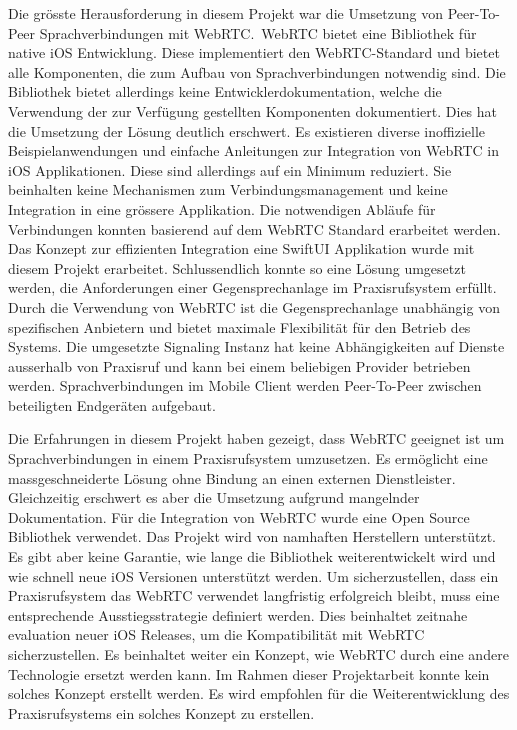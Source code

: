 Die grösste Herausforderung in diesem Projekt war die Umsetzung von Peer-To-Peer Sprachverbindungen mit WebRTC.\
WebRTC bietet eine Bibliothek für native iOS Entwicklung.
Diese implementiert den WebRTC-Standard und bietet alle Komponenten, die zum Aufbau von Sprachverbindungen notwendig sind.
Die Bibliothek bietet allerdings keine Entwicklerdokumentation, welche die Verwendung der zur Verfügung gestellten Komponenten dokumentiert.
Dies hat die Umsetzung der Lösung deutlich erschwert.
Es existieren diverse inoffizielle Beispielanwendungen und einfache Anleitungen zur Integration von WebRTC in iOS Applikationen.
Diese sind allerdings auf ein Minimum reduziert.
Sie beinhalten keine Mechanismen zum Verbindungsmanagement und keine Integration in eine grössere Applikation.
Die notwendigen Abläufe für Verbindungen konnten basierend auf dem WebRTC Standard erarbeitet werden.
Das Konzept zur effizienten Integration eine SwiftUI Applikation wurde mit diesem Projekt erarbeitet.
Schlussendlich konnte so eine Lösung umgesetzt werden, die Anforderungen einer Gegensprechanlage im Praxisrufsystem erfüllt.
Durch die Verwendung von WebRTC ist die Gegensprechanlage unabhängig von spezifischen Anbietern und bietet maximale Flexibilität für den Betrieb des Systems.
Die umgesetzte Signaling Instanz hat keine Abhängigkeiten auf Dienste ausserhalb von Praxisruf und kann bei einem beliebigen Provider betrieben werden.
Sprachverbindungen im Mobile Client werden Peer-To-Peer zwischen beteiligten Endgeräten aufgebaut.

Die Erfahrungen in diesem Projekt haben gezeigt, dass WebRTC geeignet ist um Sprachverbindungen in einem Praxisrufsystem umzusetzen.
Es ermöglicht eine massgeschneiderte Lösung ohne Bindung an einen externen Dienstleister.
Gleichzeitig erschwert es aber die Umsetzung aufgrund mangelnder Dokumentation.
Für die Integration von WebRTC wurde eine Open Source Bibliothek verwendet.
Das Projekt wird von namhaften Herstellern unterstützt.
Es gibt aber keine Garantie, wie lange die Bibliothek weiterentwickelt wird und wie schnell neue iOS Versionen unterstützt werden.
Um sicherzustellen, dass ein Praxisrufsystem das WebRTC verwendet langfristig erfolgreich bleibt, muss eine entsprechende Ausstiegsstrategie definiert werden.
Dies beinhaltet zeitnahe evaluation neuer iOS Releases, um die Kompatibilität mit WebRTC sicherzustellen.
Es beinhaltet weiter ein Konzept, wie WebRTC durch eine andere Technologie ersetzt werden kann.
Im Rahmen dieser Projektarbeit konnte kein solches Konzept erstellt werden.
Es wird empfohlen für die Weiterentwicklung des Praxisrufsystems ein solches Konzept zu erstellen.

